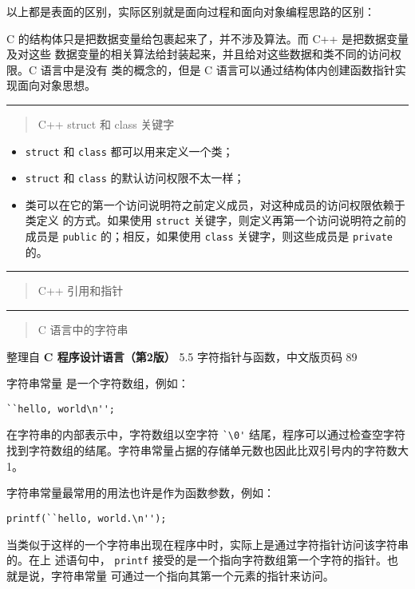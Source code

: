 以上都是表面的区别，实际区别就是面向过程和面向对象编程思路的区别：

C 的结构体只是把数据变量给包裹起来了，并不涉及算法。而 C++ 是把数据变量及对这些
数据变量的相关算法给封装起来，并且给对这些数据和类不同的访问权限。C 语言中是没有
类的概念的，但是 C 语言可以通过结构体内创建函数指针实现面向对象思想。


\noindent\rule[0.25\baselineskip]{\textwidth}{1pt}

\begin{quotation}
  {\color{red}C++ struct 和 class 关键字}
\end{quotation}

\begin{itemize}
\item \verb|struct| 和 \verb|class| 都可以用来定义一个类；
\item \verb|struct| 和 \verb|class| 的默认访问权限不太一样；
\item 类可以在它的第一个访问说明符之前定义成员，对这种成员的访问权限依赖于类定义
  的方式。如果使用 \verb|struct| 关键字，则定义再第一个访问说明符之前的成员是
  \verb|public| 的；相反，如果使用 \verb|class| 关键字，则这些成员是
  \verb|private| 的。
\end{itemize}


\noindent\rule[0.25\baselineskip]{\textwidth}{1pt}

\begin{quotation}
  {\color{red}C++ 引用和指针}
\end{quotation}



\noindent\rule[0.25\baselineskip]{\textwidth}{1pt}

\begin{quotation}
  {\color{red}C 语言中的字符串}
\end{quotation}

\noindent 整理自 \textbf{C 程序设计语言（第2版）} 5.5 字符指针与函数，中文版页码 89

字符串常量 是一个字符数组，例如：

\verb|``hello, world\n'';|

\noindent 在字符串的内部表示中，字符数组以空字符 \verb|`\0'| 结尾，程序可以通过检查空字符
找到字符数组的结尾。字符串常量占据的存储单元数也因此比双引号内的字符数大 1。

字符串常量最常用的用法也许是作为函数参数，例如：

\verb|printf(``hello, world.\n'');|

\noindent 当类似于这样的一个字符串出现在程序中时，实际上是通过字符指针访问该字符串的。在上
述语句中， \verb|printf| 接受的是一个指向字符数组第一个字符的指针。也就是说，字符串常量
可通过一个指向其第一个元素的指针来访问。

